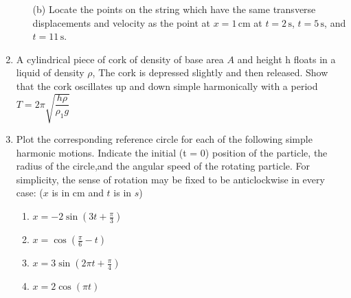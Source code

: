 \begin{enumerate}[label=\thesection.\arabic*,ref=\thesection.\theenumi]
\begin{enumerate}
    \item[(b)] Locate the points on the string which have the same transverse displacements and velocity as the point at $x = 1\,\text{cm}$ at $t = 2\,\text{s}$, $t = 5\,\text{s}$, and $t = 11\,\text{s}$.
\end{enumerate}
\solution
\pagebreak

\item A cylindrical piece of cork of density of base area $A$ and height h floats in a liquid of density $\rho$, The cork is depressed slightly and then released. Show that the cork oscillates up and down simple harmonically with a period $T = 2\pi\sqrt{\dfrac{h\rho}{\rho_{1}g}}$ \\
\solution
\pagebreak

\item Plot the corresponding reference circle for each of the following simple harmonic
motions. Indicate the initial (t = 0) position of the particle, the radius of the circle,and the angular speed of the rotating particle. For simplicity, the sense of rotation
may be fixed to be anticlockwise in every case: ($x$ is in cm and $t$ is in $s$)
\begin{enumerate}[label=\alph*)]
    \item $x = -2 \sin(3t + \frac{\pi}{3})$
    \item $x = \cos(\frac{\pi}{6} - t)$
    \item $x = 3 \sin(2\pi t + \frac{\pi}{4})$
    \item $x = 2 \cos(\pi t)$
\end{enumerate}

\solution

\pagebreak
\end{enumerate}
